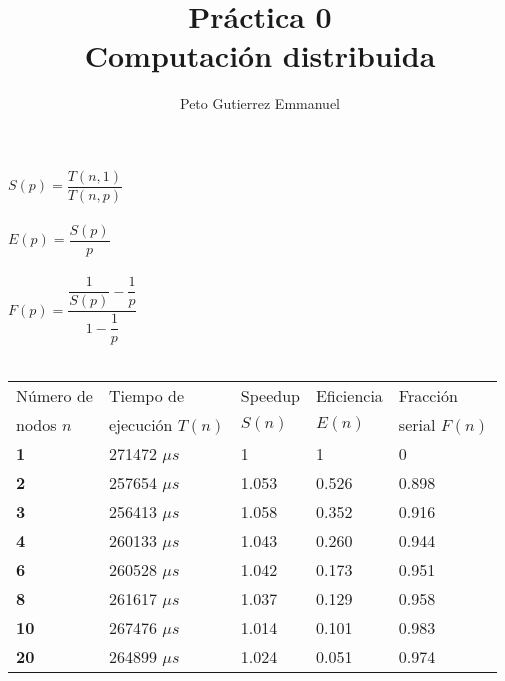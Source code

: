 \documentclass{article}
\title{Práctica 0 \\ Computación distribuida}
\author{Peto Gutierrez Emmanuel}
\begin{document}
\maketitle

$S(p)= \dfrac{T(n,1)}{T(n,p)}$ \\ \ \\

$E(p)= \dfrac{S(p)}{p}$ \\ \ \\

$F(p)= \dfrac{ \dfrac{1}{S(p)} - \dfrac{1}{p}}{1- \dfrac{1}{p}}$\\ \ \\

\begin{table}[htbp]
\begin{center}
\begin{tabular}{|l|l|l|l|l|}
\hline
Número de & Tiempo de & Speedup & Eficiencia & Fracción\\
nodos $n$ & ejecución $T(n)$ & $S(n)$ & $E(n)$ & serial $F(n)$ 
\\ \hline
\textbf{1} & 271472 $\mu s$ & 1 & 1 & 0 \\ \hline
\textbf{2} & 257654 $\mu s$ & 1.053 & 0.526 & 0.898 \\ \hline
\textbf{3} & 256413 $\mu s$ & 1.058 & 0.352 & 0.916 \\ \hline
\textbf{4} & 260133 $\mu s$ & 1.043 & 0.260 & 0.944 \\ \hline
\textbf{6} & 260528 $\mu s$ & 1.042 & 0.173 & 0.951 \\ \hline
\textbf{8} & 261617 $\mu s$ & 1.037 & 0.129 & 0.958 \\ \hline
\textbf{10} & 267476 $\mu s$ & 1.014 & 0.101 & 0.983 \\ \hline
\textbf{20} & 264899 $\mu s$ & 1.024 & 0.051 & 0.974 \\ \hline
\end{tabular}
\end{center}
\end{table}
\end{document}
